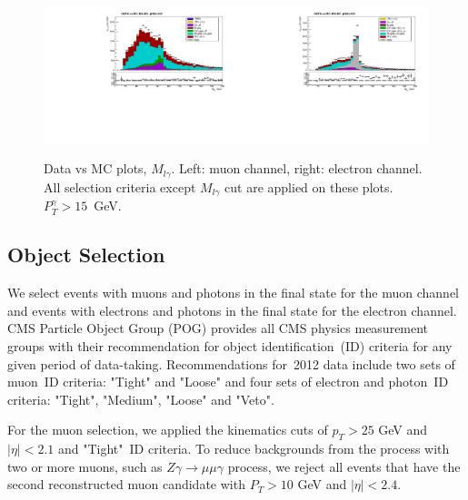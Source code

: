 \begin{figure}[htb]
  \begin{center}
   \includegraphics[width=0.5\textwidth]{../figs/figs_v11/MUON_WGamma/PrepareYields/c_TotalDATAvsMC_EtaCommon__Mpholep1_pt15to500_.pdf}\includegraphics[width=0.5\textwidth]{../figs/figs_v11/ELECTRON_WGamma/PrepareYields/c_TotalDATAvsMC_EtaCommon__Mpholep1PRELIMINARY_FOR_E_TO_GAMMA_WITH_PSV_CUT_pt15to500_.pdf}
  \caption{Data vs MC plots, $M_{l\gamma}$. Left: muon channel, right: electron channel. All selection criteria except $M_{l\gamma}$ cut are applied on these plots. $P_T^{\gamma}>15$~GeV. }
  \label{fig:DATAvsMC_Mpholep1}
  \end{center}
\end{figure}

\subsection{Object Selection}
\label{sec:AN_ObjectSelection}

We select events with muons and photons in the final state for the muon channel and events with electrons and photons in the final state for the electron channel. CMS Particle Object Group (POG) provides all CMS physics measurement groups with their recommendation for object identification~(ID) criteria for any given period of data-taking. Recommendations for~2012 data include two sets of muon~ID criteria: "Tight" and "Loose" and four sets of electron and photon~ID criteria: "Tight", "Medium", "Loose" and "Veto".

For the muon selection, we applied the kinematics cuts of $p_T>25$ GeV and $|\eta|<2.1$ and "Tight"~ID criteria. To reduce backgrounds from the process with two or more muons, such as $Z\gamma\rightarrow\mu\mu\gamma$ process, we reject all events that have the second reconstructed muon candidate with $P_T>10$ GeV and $|\eta|<2.4$. 

